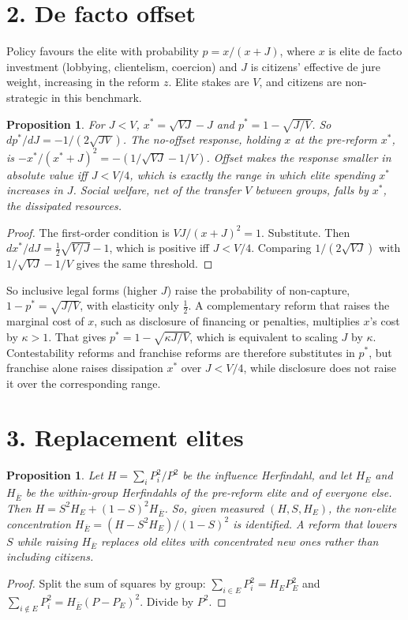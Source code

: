 \documentclass[11pt]{article}
\newtheorem{proposition}[theorem]{Proposition}
\theoremstyle{definition}
\begin{document}
\section*{2. De facto offset}
Policy favours the elite with probability $p=x/(x+J)$, where $x$ is elite de facto investment (lobbying, clientelism,
coercion) and $J$ is citizens' effective de jure weight, increasing in the reform $z$. Elite stakes are $V$, and citizens are
non-strategic in this benchmark.
\begin{proposition}\label{prop:contest}
For $J<V$, $x^*=\sqrt{VJ}-J$ and $p^*=1-\sqrt{J/V}$. So $dp^*/dJ=-1/(2\sqrt{JV})$. The no-offset response, holding $x$ at
the pre-reform $x^*$, is $-x^*/(x^*+J)^2=-(1/\sqrt{VJ}-1/V)$. Offset makes the response smaller in absolute value iff $J<V/4$,
which is exactly the range in which elite spending $x^*$ increases in $J$.
Social welfare, net of the transfer $V$ between groups, falls by $x^*$, the dissipated resources.
\end{proposition}
\begin{proof}
The first-order condition is $VJ/(x+J)^2=1$. Substitute. Then $dx^*/dJ=\tfrac12\sqrt{V/J}-1$, which is positive iff $J<V/4$.
Comparing $1/(2\sqrt{VJ})$ with $1/\sqrt{VJ}-1/V$ gives the same threshold.
\end{proof}
So inclusive legal forms (higher $J$) raise the probability of non-capture, $1-p^*=\sqrt{J/V}$, with elasticity only $\tfrac12$. A complementary reform
that raises the marginal cost of $x$, such as disclosure of financing or penalties, multiplies $x$'s cost by $\kappa>1$. That
gives $p^*=1-\sqrt{\kappa J/V}$, which is equivalent to scaling $J$ by $\kappa$. Contestability reforms and franchise reforms
are therefore substitutes in $p^*$, but franchise alone raises dissipation $x^*$ over $J<V/4$, while disclosure does not
raise it over the corresponding range.

\section*{3. Replacement elites}
\begin{proposition}\label{prop:hhi}
Let $H=\sum_iP_i^2/P^2$ be the influence Herfindahl, and let $H_E$ and $H_{\bar E}$ be the within-group Herfindahls of the
pre-reform elite and of everyone else. Then $H=S^2H_E+(1-S)^2H_{\bar E}$. So, given measured $(H,S,H_E)$, the non-elite
concentration $H_{\bar E}=(H-S^2H_E)/(1-S)^2$ is identified. A reform that lowers $S$ while raising $H_{\bar E}$ replaces old
elites with concentrated new ones rather than including citizens.
\end{proposition}
\begin{proof}
Split the sum of squares by group: $\sum_{i\in E}P_i^2=H_EP_E^2$ and $\sum_{i\notin E}P_i^2=H_{\bar E}(P-P_E)^2$. Divide by $P^2$.
\end{proof}
\end{document}
